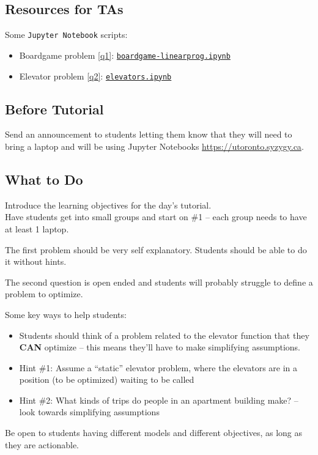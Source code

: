 \subsection*{Resources for TAs}

Some \texttt{Jupyter Notebook} scripts:

\begin{itemize}
	\item Boardgame problem \ref{q1}: \href{https://utoronto.syzygy.ca/jupyter/user-redirect/git-pull?repo=https://github.com/bigfatbernie/IBLMathModeling&subPath=tutorials/tutorial2/boardgame-linearprog.ipynb}{\tt boardgame-linearprog.ipynb}
	\item Elevator problem \ref{q2}: \href{https://utoronto.syzygy.ca/jupyter/user-redirect/git-pull?repo=https://github.com/bigfatbernie/IBLMathModeling&subPath=tutorials/tutorial2/elevators.ipynb}{\tt elevators.ipynb}
\end{itemize}


\subsection*{Before Tutorial}

Send an announcement to students letting them know that they will need to bring a laptop and will be using Jupyter Notebooks \url{https://utoronto.syzygy.ca}.


\subsection*{What to Do}
	
Introduce the learning objectives for the day's tutorial. \\

Have students get into small groups and start on \#1 -- each group needs to have at least 1 laptop. 

The first problem should be very self explanatory. Students should be able to do it without hints.

\hfill 

The second question is open ended and students will probably struggle to define a problem to optimize.

Some key ways to help students:
\begin{itemize}
	\item Students should think of a problem related to the elevator function that they \textbf{CAN} optimize -- this means they'll have to make simplifying assumptions.
	\item Hint \#1: Assume a ``static'' elevator problem, where the elevators are in a position (to be optimized) waiting to be called
	\item Hint \#2: What kinds of trips do people in an apartment building make? -- look towards simplifying assumptions
\end{itemize}

Be open to students having different models and different objectives, as long as they are actionable.

	


%
	
	

	
	
